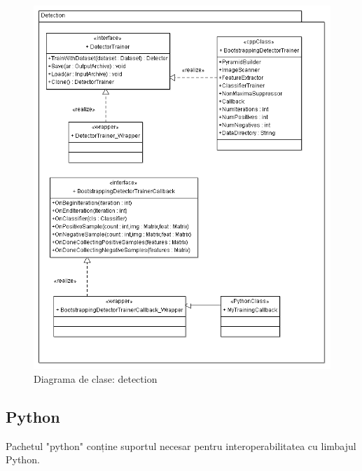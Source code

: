 \begin{figure}[H]
	\centering
		\includegraphics[width=1.00\textwidth]{uml/detection2ClassDiagram.png}
	\caption{Diagrama de clase: detection}
	\label{fig:detection2ClassDiagram}
\end{figure}

\pagebreak
\subsection{Python}
Pachetul "python" conține suportul necesar pentru interoperabilitatea cu limbajul Python.


